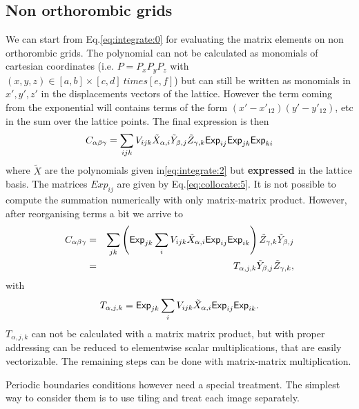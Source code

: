 \documentclass[prb]{revtex4}
\begin{document}
\subsection{Non orthorombic grids}
We can start from Eq.\ref{eq:integrate:0} for evaluating the matrix elements on
non orthorombic grids. The polynomial can not be calculated as monomials of
cartesian coordinates (i.e. $P=P_xP_yP_z$ with $(x,y,z)\in [a,b]\times [c,d]
\ times [e,f]$) but can still be written as monomials in $x',y',z'$ in the
displacements vectors of the lattice. However the term coming from the
exponential will contains terms of the form $(x'-x'_{12})(y'-y'_{12})$, etc in
the sum over the lattice points. The final expression is then
\begin{equation}
  \label{eq:integration:7}
  C_{\alpha\beta\gamma} = \sum_{ijk} V_{ijk} {\tilde X}_{\alpha,i} {\tilde Y}_{\beta,j} {\tilde Z}_{\gamma,k} {\sf Exp}_{ij}{\sf Exp}_{jk}{\sf Exp}_{ki}
\end{equation}
where ${\tilde X}$ are the polynomials given in\ref{eq:integrate:2} but {\bf
  expressed} in the lattice basis. The matrices $Exp_{ij}$ are given by
Eq.\ref{eq:collocate:5}. It is not possible to compute the summation numerically
with only matrix-matrix product. However, after reorganising terms a bit we arrive to
\begin{eqnarray}
  \label{eq:integration:8}
  C_{\alpha\beta\gamma} &=& \sum_{jk}\left({\sf Exp}_{jk}\sum_{i}{V}_{ijk} {\tilde X}_{\alpha,i} {\sf Exp}_{ij} {\sf Exp}_{ik}\right) {\tilde Z}_{\gamma,k} {\tilde Y}_{\beta,j}\\
  &=& T_{\alpha,j,k} {\tilde Y}_{\beta,j} {\tilde Z}_{\gamma,k},
\end{eqnarray}
with
\begin{equation}
  \label{eq:integration:9}
  T_{\alpha,j,k} ={\sf Exp}_{jk}\sum_{i}V_{ijk} {\tilde X}_{\alpha,i} {\sf Exp}_{ij} {\sf Exp}_{ik}.
\end{equation}
$T_{\alpha,j,k}$ can not be calculated with a matrix matrix product, but with
proper addressing can be reduced to elementwise scalar multiplications, that are
easily vectorizable. The remaining steps can be done with matrix-matrix
multiplication.

Periodic boundaries conditions however need a special treatment. The simplest
way to consider them is to use tiling and treat each image separately.
\end{document}
